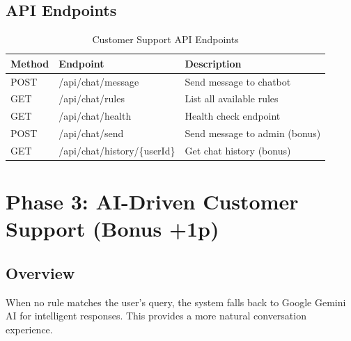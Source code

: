 \documentclass[12pt,a4paper]{article}
\begin{document}
\subsection{API Endpoints}
\begin{table}[H]
\centering
\begin{tabular}{|l|l|p{5cm}|}
\hline
\textbf{Method} & \textbf{Endpoint} & \textbf{Description} \\
\hline
POST & /api/chat/message & Send message to chatbot \\
GET & /api/chat/rules & List all available rules \\
GET & /api/chat/health & Health check endpoint \\
POST & /api/chat/send & Send message to admin (bonus) \\
GET & /api/chat/history/\{userId\} & Get chat history (bonus) \\
\hline
\end{tabular}
\caption{Customer Support API Endpoints}
\end{table}

\section{Phase 3: AI-Driven Customer Support (Bonus +1p)}

\subsection{Overview}
When no rule matches the user's query, the system falls back to Google Gemini AI for intelligent responses. This provides a more natural conversation experience.
\end{document}
